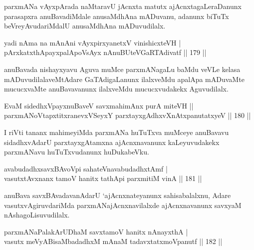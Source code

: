 \begin{artha}
parxmANa vAyxpArada naMtaravU jAcnxta matutx ajAcnxtagaLeraDanunx parasapxra anuBavadiMdale anusaMdhAna mADuvanu, adanunx biTuTx beVreyAvudariMdalU anusaMdhAna mADuvudilalx.
\end{artha}

\begin{shl}
yadi nAma na mAnAni vAyxpirxyanetxV vinishicxteVH | \\
pArxkatxthA\s payxpalApoV\s sAyx nAnuBUteVGaRTAdivatf \hfill||  179 ||  
\end{shl}

\begin{artha}
anuBavada nishayxyavu Aguva muMce parxmANagaLu baMdu veVLe kelasa mADuvudilalaveMtAdare GaTAdigaLanunx ilalxveMdu apalApa mADuvaMte mucucxvaMte anuBavavanunx ilalxveMdu mucucxvudakekx Aguvudilalx.
\end{artha}

\begin{shl}
EvaM sidedhxV\s payxnuBaveV savxmahimAnx purA miteVH ||  \\
parxmANoVtapxtitxranevxVSeyxY parxtayxgAdhxvXnAtxpanutatxyeV \hfill||  180 ||  
\end{shl}

\begin{artha}
I riVti tananx mahimeyiMda parxmANa huTuTxva muMceye anuBavavu sidadhxvAdarU parxtayxgAtamxna ajAcnxnavanunx kaLeyuvudakekx parxmANavu huTuTxvudanunx huDukabeVku.
\end{artha}


\begin{shl}
avabudadhxsavxBAvoV\s pi sahateV\s navabudadhxtAmf | \\
vasutxtAvxnanx tamoV hanitx tathA\s pi parxmitiM vinA \hfill||  181 ||  
\end{shl}

\begin{artha}
anuBava savxBAvadavanAdarU `ajAcnxnateyanunx sahisabalalxnu, Adare vasutxvAgiruvdariMda parxmANajAcnxnavilalxde ajAcnxnavanunx savxyaM nAshagoLisuvudilalx.
\end{artha}

\begin{shl}
parxmANaPalakArUDhaM savxtamoV hanitx nAnayxthA | \\
vasutx meVyABisaMbadadhxM mAnaM tadavxtatxmoVpanutf \hfill||  182 ||  
\end{shl}


